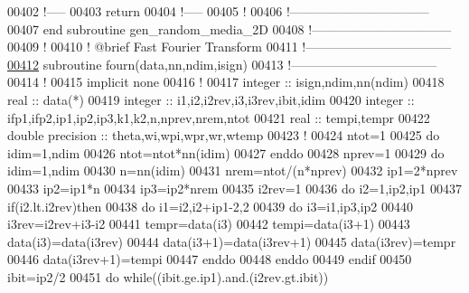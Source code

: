 \begin{DoxyCode}
00402     \textcolor{comment}{!-----}
00403     return
00404     \textcolor{comment}{!-----}
00405     \textcolor{comment}{!}
00406   \textcolor{comment}{!---------------------------------}
00407 \textcolor{keyword}{  end subroutine gen\_random\_media\_2D}
00408   \textcolor{comment}{!---------------------------------}
00409   \textcolor{comment}{!}
00410   \textcolor{comment}{! @brief Fast Fourier Transform}
00411   \textcolor{comment}{!-----------------------------------}
\hypertarget{module__random__media_8f90_source_l00412}{}\hyperlink{classmodule__random__media_acca655a7647ef0bd11dc4365dbd2557e}{00412}   \textcolor{keyword}{subroutine }fourn(data,nn,ndim,isign)
00413   \textcolor{comment}{!-----------------------------------}
00414     \textcolor{comment}{!}
00415     \textcolor{keyword}{implicit none}
00416     \textcolor{comment}{!}
00417     \textcolor{keywordtype}{integer} :: isign,ndim,nn(ndim)
00418     \textcolor{keywordtype}{real} :: data(*)
00419     \textcolor{keywordtype}{integer} :: i1,i2,i2rev,i3,i3rev,ibit,idim
00420     \textcolor{keywordtype}{integer} :: ifp1,ifp2,ip1,ip2,ip3,k1,k2,n,nprev,nrem,ntot
00421     \textcolor{keywordtype}{real} :: tempi,tempr
00422     \textcolor{keywordtype}{double precision} :: theta,wi,wpi,wpr,wr,wtemp
00423     \textcolor{comment}{!}
00424     ntot=1
00425     \textcolor{keyword}{do} idim=1,ndim
00426        ntot=ntot*nn(idim)
00427     \textcolor{keyword}{enddo}
00428     nprev=1
00429     \textcolor{keyword}{do} idim=1,ndim
00430        n=nn(idim)
00431        nrem=ntot/(n*nprev)
00432        ip1=2*nprev
00433        ip2=ip1*n
00434        ip3=ip2*nrem
00435        i2rev=1
00436        \textcolor{keyword}{do} i2=1,ip2,ip1
00437           \textcolor{keyword}{if}(i2.lt.i2rev)\textcolor{keyword}{then}
00438              \textcolor{keyword}{do} i1=i2,i2+ip1-2,2
00439                 \textcolor{keyword}{do} i3=i1,ip3,ip2
00440                    i3rev=i2rev+i3-i2
00441                    tempr=\textcolor{keyword}{data}(i3)
00442                    tempi=\textcolor{keyword}{data}(i3+1)
00443                    \textcolor{keyword}{data}(i3)=\textcolor{keyword}{data}(i3rev)
00444                    \textcolor{keyword}{data}(i3+1)=\textcolor{keyword}{data}(i3rev+1)
00445                    \textcolor{keyword}{data}(i3rev)=tempr
00446                    \textcolor{keyword}{data}(i3rev+1)=tempi
00447                 \textcolor{keyword}{enddo}
00448              \textcolor{keyword}{enddo}
00449           \textcolor{keyword}{endif}
00450           ibit=ip2/2
00451           \textcolor{keyword}{do} \textcolor{keyword}{while}((ibit.ge.ip1).and.(i2rev.gt.ibit)) 

\end{DoxyCode}
